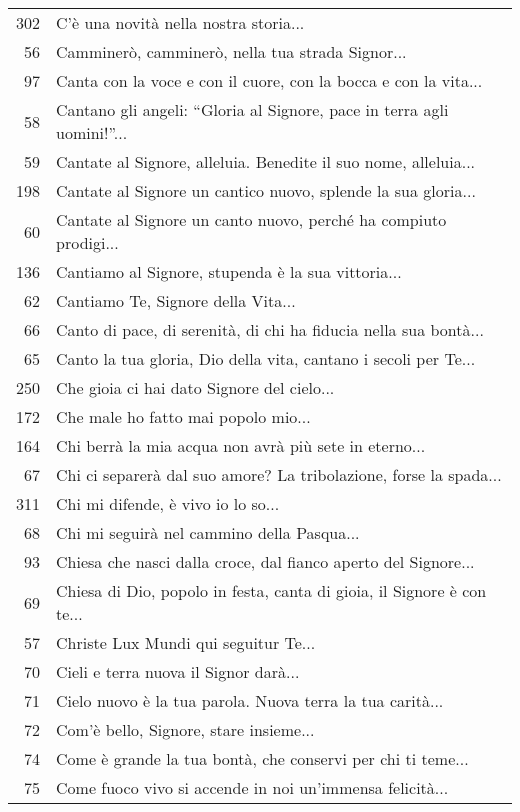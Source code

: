 {\begin{flushleft}
\begin{longtable}{r m{11cm}}
    302 & C'è una novità nella nostra storia...\\
    56 & Camminerò, camminerò, nella tua strada Signor...\\
    97 & Canta con la voce e con il cuore, con la bocca e con la vita...\\
    58 & Cantano gli angeli: ``Gloria al Signore, pace in terra agli uomini!''...\\
    59 & Cantate al Signore, alleluia. Benedite il suo nome, alleluia...\\
    198 & Cantate al Signore un cantico nuovo, splende la sua gloria...\\
    60 & Cantate al Signore un canto nuovo, perché ha compiuto prodigi...\\
    136 & Cantiamo al Signore, stupenda è la sua vittoria...\\
    62 & Cantiamo Te, Signore della Vita...\\
    66 & Canto di pace, di serenità, di chi ha fiducia nella sua bontà...\\
    65 & Canto la tua gloria, Dio della vita, cantano i secoli per Te...\\
    250 & Che gioia ci hai dato Signore del cielo...\\
    172 & Che male ho fatto mai popolo mio...\\
    164 & Chi berrà la mia acqua non avrà più sete in eterno...\\
    67 & Chi ci separerà dal suo amore? La tribolazione, forse la spada...\\
    311 & Chi mi difende, è vivo io lo so...\\
    68 & Chi mi seguirà nel cammino della Pasqua...\\
    93 & Chiesa che nasci dalla croce, dal fianco aperto del Signore...\\
    69 & Chiesa di Dio, popolo in festa, canta di gioia, il Signore è con te...\\
    57 & Christe Lux Mundi qui seguitur Te...\\
    70 & Cieli e terra nuova il Signor darà...\\
    71 & Cielo nuovo è la tua parola. Nuova terra la tua carità...\\
    72 & Com'è bello, Signore, stare insieme...\\
    74 & Come è grande la tua bontà, che conservi per chi ti teme...\\
    75 & Come fuoco vivo si accende in noi un'immensa felicità...\\

\end{longtable}
\end{flushleft}}
